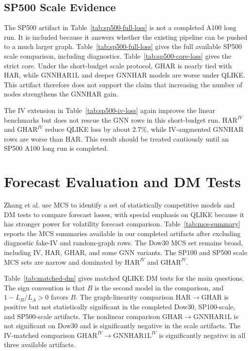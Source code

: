 \documentclass[11pt]{article}
\begin{document}


\subsection{SP500 Scale Evidence}

The SP500 artifact in Table~\ref{tab:sp500-full-loss} is not a completed A100 long run.
It is included because it answers whether the existing pipeline can be pushed to a much larger graph.
Table~\ref{tab:sp500-full-loss} gives the full available SP500 scale comparison, including diagnostics.
Table~\ref{tab:sp500-core-loss} gives the strict core.
Under the short-budget scale protocol, \(\mathrm{GHAR}\) is nearly tied with HAR, while GNNHAR1L and deeper GNNHAR models are worse under QLIKE.
This artifact therefore does not support the claim that increasing the number of nodes strengthens the GNNHAR gain.





The IV extension in Table~\ref{tab:sp500-iv-loss} again improves the linear benchmarks but does not rescue the GNN rows in this short-budget run.
\(\mathrm{HAR}^{IV}\) and \(\mathrm{GHAR}^{IV}\) reduce QLIKE loss by about \(2.7\%\), while IV-augmented GNNHAR rows are worse than HAR.
This result should be treated cautiously until an SP500 A100 long run is completed.



\section{Forecast Evaluation and DM Tests}

Zhang et al. use MCS to identify a set of statistically competitive models and DM tests to compare forecast losses, with special emphasis on QLIKE because it has stronger power for volatility forecast comparison.
Table~\ref{tab:mcs-summary} reports the MCS summaries available in our completed artifacts after excluding diagnostic fake-IV and random-graph rows.
The Dow30 MCS set remains broad, including IV, HAR, GHAR, and some GNN variants.
The SP100 and SP500 scale MCS sets are narrow and dominated by \(\mathrm{HAR}^{IV}\) and \(\mathrm{GHAR}^{IV}\).



Table~\ref{tab:matched-dm} gives matched QLIKE DM tests for the main questions.
The sign convention is that \(B\) is the second model in the comparison, and \(1-L_B/L_A>0\) favors \(B\).
The graph-linearity comparison \(\mathrm{HAR}\rightarrow\mathrm{GHAR}\) is positive but not statistically significant in the completed Dow30, SP100-scale, and SP500-scale artifacts.
The nonlinear comparison \(\mathrm{GHAR}\rightarrow\mathrm{GNNHAR1L}\) is not significant on Dow30 and is significantly negative in the scale artifacts.
The IV-matched comparison \(\mathrm{GHAR}^{IV}\rightarrow\mathrm{GNNHAR1L}^{IV}\) is significantly negative in all three available artifacts.
\end{document}
